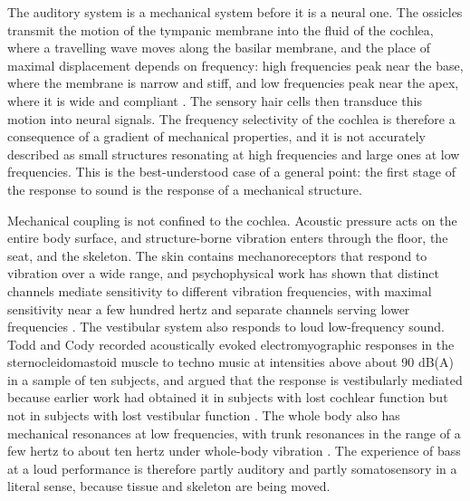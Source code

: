 \documentclass[11pt]{article}
\theoremstyle{plain}
\theoremstyle{definition}
\begin{document}
The auditory system is a mechanical system before it is a neural one. The ossicles transmit the motion of the tympanic membrane into the fluid of the cochlea, where a travelling wave moves along the basilar membrane, and the place of maximal displacement depends on frequency: high frequencies peak near the base, where the membrane is narrow and stiff, and low frequencies peak near the apex, where it is wide and compliant \citep{bekesy1960,robles2001}. The sensory hair cells then transduce this motion into neural signals. The frequency selectivity of the cochlea is therefore a consequence of a gradient of mechanical properties, and it is not accurately described as small structures resonating at high frequencies and large ones at low frequencies. This is the best-understood case of a general point: the first stage of the response to sound is the response of a mechanical structure.

Mechanical coupling is not confined to the cochlea. Acoustic pressure acts on the entire body surface, and structure-borne vibration enters through the floor, the seat, and the skeleton. The skin contains mechanoreceptors that respond to vibration over a wide range, and psychophysical work has shown that distinct channels mediate sensitivity to different vibration frequencies, with maximal sensitivity near a few hundred hertz and separate channels serving lower frequencies \citep{bolanowski1988}. The vestibular system also responds to loud low-frequency sound. Todd and Cody recorded acoustically evoked electromyographic responses in the sternocleidomastoid muscle to techno music at intensities above about 90 dB(A) in a sample of ten subjects, and argued that the response is vestibularly mediated because earlier work had obtained it in subjects with lost cochlear function but not in subjects with lost vestibular function \citep{todd2000}. The whole body also has mechanical resonances at low frequencies, with trunk resonances in the range of a few hertz to about ten hertz under whole-body vibration \citep{griffin1990}. The experience of bass at a loud performance is therefore partly auditory and partly somatosensory in a literal sense, because tissue and skeleton are being moved.
\end{document}
